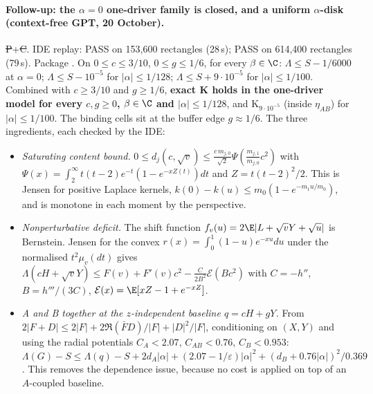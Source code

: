 \paragraph{Follow-up: the $\alpha=0$ one-driver family is closed, and a uniform $\alpha$-disk (context-free GPT, 20 October).} \st{P}+\st{C}. IDE replay: 
PASS on 153{,}600 rectangles (28\,s);  PASS on 614{,}400 rectangles (79\,s). Package .
On $0\le c\le3/10$, $0\le g\le1/6$, for every $\beta\in\C$: $\Lambda\le S-1/6000$ at $\alpha=0$; $\Lambda\le S-10^{-5}$ for $|\alpha|\le1/128$; $\Lambda\le S+9\cdot10^{-5}$ for
$|\alpha|\le1/100$. Combined with $c\ge3/10$ and $g\ge1/6$, \textbf{exact K holds in the one-driver model for every $c,g\ge0$, $\beta\in\C$ and $|\alpha|\le1/128$}, and K$_{9\cdot10^{-5}}$
(inside $\eta_{AB}$) for $|\alpha|\le1/100$. The binding cells sit at the buffer edge $g\approx1/6$. The three ingredients, each checked by the IDE:
\begin{itemize}
\item \emph{Saturating content bound.} $0\le d_j(c,\sqrt v)\le\frac{c\,m_{j,0}}{\sqrt2}\Psi(\frac{m_{j,1}}{m_{j,0}}c^2)$ with $\Psi(x)=\int_2^\infty t(t-2)e^{-t}(1-e^{-xZ(t)})dt$ and
$Z=t(t-2)^2/2$. This is Jensen for positive Laplace kernels, $k(0)-k(u)\le m_0(1-e^{-m_1u/m_0})$, and is monotone in each moment by the perspective.
\item \emph{Nonperturbative deficit.} The shift function $f_v(u)=2\E|L+\sqrt vY+\sqrt u|$ is Bernstein. Jensen for the convex $r(x)=\int_0^1(1-u)e^{-xu}du$ under the normalised
$t^2\mu_v(dt)$ gives $\Lambda(cH+\sqrt vY)\le F(v)+F'(v)c^2-\frac{C}{2B^2}\mathcal E(Bc^2)$ with $C=-h''$, $B=h'''/(3C)$, $\mathcal E(x)=\E[xZ-1+e^{-xZ}]$.
\item \emph{A and B together at the $z$-independent baseline $q=cH+gY$.} From $2|F+D|\le2|F|+2\Re(\bar FD)/|F|+|D|^2/|F|$, conditioning on $(X,Y)$ and using the radial potentials
$C_A<2.07$, $C_{AB}<0.76$, $C_B<0.953$: $\Lambda(G)-S\le\Lambda(q)-S+2d_A|\alpha|+(2.07-1/\varepsilon)|\alpha|^2+(d_B+0.76|\alpha|)^2/0.369$. This removes the dependence issue, because
no cost is applied on top of an $A$-coupled baseline.
\end{itemize}

